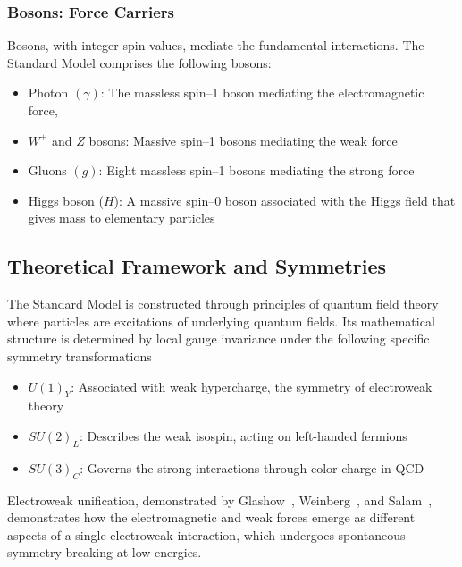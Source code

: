 \subsubsection{Bosons: Force Carriers}
Bosons, with integer spin values, mediate the fundamental interactions. The Standard Model comprises the following bosons:
\begin{itemize}
    \item Photon $(\gamma)$: The massless spin--1 boson mediating the electromagnetic force,
    \item $W^\pm$ and $Z$ bosons: Massive spin--1 bosons mediating the weak force
    \item Gluons $(g)$: Eight massless spin--1 bosons mediating the strong force
    \item Higgs boson ($H$): A massive spin--0 boson associated with the Higgs field that gives mass to elementary particles
\end{itemize}

\subsection{Theoretical Framework and Symmetries}
The Standard Model is constructed through principles of quantum field theory where particles are excitations of underlying quantum fields.
%
Its mathematical structure is determined by local gauge invariance under the following specific symmetry transformations
\begin{itemize}
    \item $U(1)_Y$: Associated with weak hypercharge, the symmetry of electroweak theory
    \item $SU(2)_L$: Describes the weak isospin, acting on left-handed fermions
    \item $SU(3)_C$: Governs the strong interactions through color charge in QCD
\end{itemize}

Electroweak unification, demonstrated by Glashow~\cite{Glashow:1961tr}, Weinberg~\cite{Weinberg:1979pi}, and Salam~\cite{Salam:1980jd}, demonstrates how the electromagnetic and weak forces emerge as different aspects of a single electroweak interaction, which undergoes spontaneous symmetry breaking at low energies.

